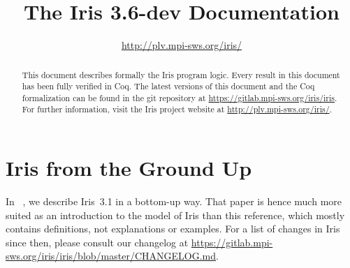 \documentclass[10pt]{article}
\title{\bfseries The Iris 3.6-dev Documentation}
\author{\url{http://plv.mpi-sws.org/iris/}}
\begin{document}
\maketitle
\thispagestyle{empty}
\vfill
\begin{abstract}
This document describes formally the Iris program logic.
Every result in this document has been fully verified in Coq.
The latest versions of this document and the Coq formalization can be found in the git repository at \url{https://gitlab.mpi-sws.org/iris/iris}.
For further information, visit the Iris project website at \url{http://plv.mpi-sws.org/iris/}.
\end{abstract}

\clearpage\begingroup
\tableofcontents
\endgroup

\clearpage\begingroup
\section{Iris from the Ground Up}
In ~\cite{iris-ground-up}, we describe Iris~3.1 in a bottom-up way.
That paper is hence much more suited as an introduction to the model of Iris than this reference, which mostly contains definitions, not explanations or examples.
For a list of changes in Iris since then, please consult our changelog at \url{https://gitlab.mpi-sws.org/iris/iris/blob/master/CHANGELOG.md}.
\endgroup

\clearpage\begingroup

\endgroup
\clearpage\begingroup

\endgroup
\clearpage\begingroup

\endgroup
\clearpage\begingroup

\endgroup
\clearpage\begingroup

\endgroup
\clearpage\begingroup

\endgroup
\clearpage\begingroup

\endgroup
\clearpage\begingroup

\endgroup
\clearpage\begingroup

\endgroup
\clearpage\begingroup
\printbibliography
\endgroup
\end{document}
